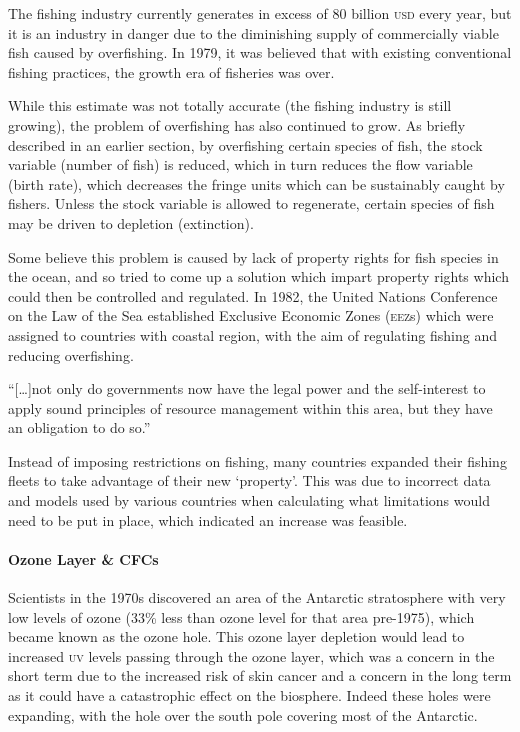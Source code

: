 The fishing industry currently generates in excess of 80 billion \textsc{usd} every year, but it is an industry in danger due to the diminishing supply of commercially viable fish caused by overfishing. In 1979, it was believed that with existing conventional fishing practices, the growth era of fisheries was over.

While this estimate was not totally accurate (the fishing industry is still growing), the problem of overfishing has also continued to grow. As briefly described in an earlier section, by overfishing certain species of fish, the stock variable (number of fish) is reduced, which in turn reduces the flow variable (birth rate), which decreases the fringe units which can be sustainably caught by fishers. Unless the stock variable is allowed to regenerate, certain species of fish may be driven to depletion (extinction).

Some believe this problem is caused by lack of property rights for fish species in the ocean, and so tried to come up a solution which impart property rights which could then be controlled and regulated. In 1982, the United Nations Conference on the Law of the Sea established Exclusive Economic Zones (\textsc{eez}s) which were assigned to countries with coastal region, with the aim of regulating fishing and reducing overfishing.~\cite{Canada-sea-law}

``[\ldots]not only do governments now have the legal power and the self-interest to apply sound principles of resource management within this area, but they have an obligation to do so.''

Instead of imposing restrictions on fishing, many countries expanded their fishing fleets to take advantage of their new `property'. This was due to incorrect data and models used by various countries when calculating what limitations would need to be put in place, which indicated an increase was feasible.

\paragraph{Ozone Layer \& CFCs}

Scientists in the 1970s discovered an area of the Antarctic stratosphere with very low levels of ozone (33\% less than ozone level for that area pre-1975), which became known as the ozone hole. This ozone layer depletion would lead to increased \textsc{uv} levels passing through the ozone layer, which was a concern in the short term due to the increased risk of skin cancer and a concern in the long term as it could have a catastrophic effect on the biosphere. Indeed these holes were expanding, with the hole over the south pole covering most of the Antarctic.

